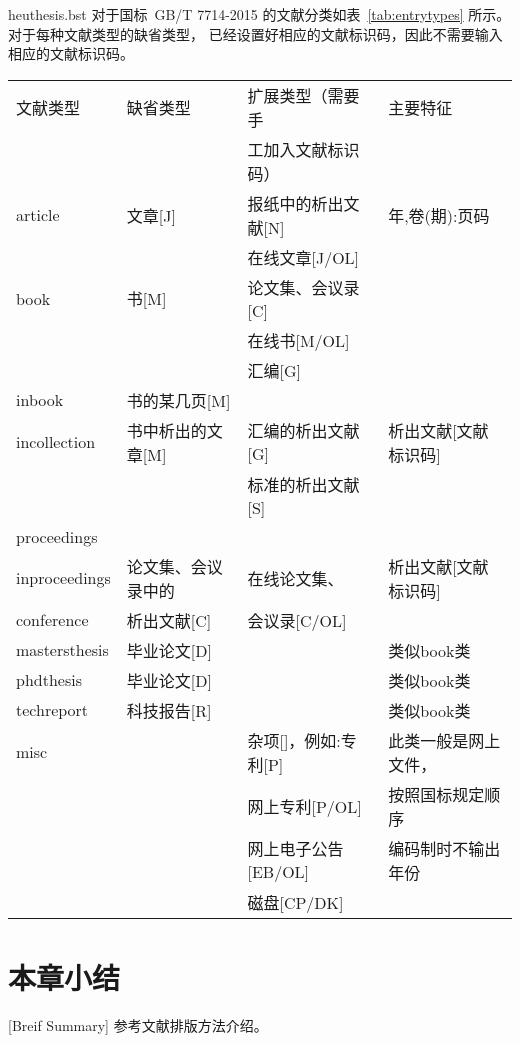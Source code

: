 heuthesis.bst 对于国标~GB/T 7714-2015 的文献分类如表~\ref{tab:entrytypes} 所示。对于每种文献类型的缺省类型，
已经设置好相应的文献标识码，因此不需要输入相应的文献标识码。

\begin{table}[htbp]
  \vspace{0.5em}\centering\wuhao
  \begin{tabular}{llll}
    \toprule[1.5pt]
    文献类型      & 缺省类型           & 扩展类型（需要手     & 主要特征             \\
                  &                    & 工加入文献标识码）   &                      \\
    \midrule[1pt]
    article       & 文章[J]            & 报纸中的析出文献[N]  & 年,卷(期):页码       \\
                  &                    & 在线文章[J/OL]       &                      \\
    book          & 书[M]              & 论文集、会议录[C]    &                      \\
                  &                    & 在线书[M/OL]         &                      \\
                  &                    & 汇编[G]              &                      \\
    inbook        & 书的某几页[M]      &                      &                      \\
    incollection  & 书中析出的文章[M]  & 汇编的析出文献[G]    & 析出文献[文献标识码] \\
                  &                    & 标准的析出文献[S]    &                      \\
    proceedings   &                    &                      &                      \\
    inproceedings & 论文集、会议录中的 & 在线论文集、         & 析出文献[文献标识码] \\
    conference    & 析出文献[C]        & 会议录[C/OL]         &                      \\
    mastersthesis & 毕业论文[D]        &                      & 类似book类           \\
    phdthesis     & 毕业论文[D]        &                      & 类似book类           \\
    techreport    & 科技报告[R]        &                      & 类似book类           \\
    misc          &                    & 杂项[]，例如:专利[P] & 此类一般是网上文件， \\
                  &                    & 网上专利[P/OL]       & 按照国标规定顺序     \\
                  &                    & 网上电子公告[EB/OL]  & 编码制时不输出年份   \\
                  &                    & 磁盘[CP/DK]          &                      \\
    \bottomrule[1.5pt]
  \end{tabular}
\end{table}

\section*{本章小结}[Breif Summary]
参考文献排版方法介绍。
